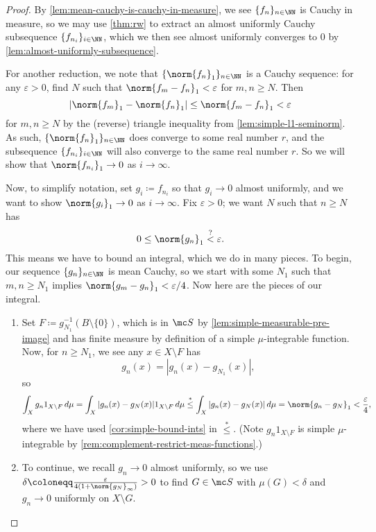 \documentclass[../notes.tex]{subfiles}
\begin{document}
\begin{proof}
	By \autoref{lem:mean-cauchy-is-cauchy-in-measure}, we see $\{f_n\}_{n\in\NN}$ is Cauchy in measure, so we may use \autoref{thm:rw} to extract an almost uniformly Cauchy subsequence $\{f_{n_i}\}_{i\in\NN}$, which we then see almost uniformly converges to $0$ by \autoref{lem:almost-uniformly-subsequence}.
	
	For another reduction, we note that $\{\norm{f_n}_1\}_{n\in\NN}$ is a Cauchy sequence: for any $\varepsilon>0$, find $N$ such that $\norm{f_m-f_n}_1<\varepsilon$ for $m,n\ge N$. Then
	\[|\norm{f_m}_1-\norm{f_n}_1|\le\norm{f_m-f_n}_1<\varepsilon\]
	for $m,n\ge N$ by the (reverse) triangle inequality from \autoref{lem:simple-l1-seminorm}. As such, $\{\norm{f_n}_1\}_{n\in\NN}$ does converge to some real number $r$, and the subsequence $\{f_{n_i}\}_{i\in\NN}$ will also converge to the same real number $r$. So we will show that $\norm{f_{n_i}}_1\to0$ as $i\to\infty$.

	Now, to simplify notation, set $g_i\coloneqq f_{n_i}$ so that $g_i\to0$ almost uniformly, and we want to show $\norm{g_i}_1\to0$ as $i\to\infty$. Fix $\varepsilon>0$; we want $N$ such that $n\ge N$ has
	\[0\le\norm{g_n}_1\stackrel?<\varepsilon.\]
	This means we have to bound an integral, which we do in many pieces. To begin, our sequence $\{g_n\}_{n\in\NN}$ is mean Cauchy, so we start with some $N_1$ such that $m,n\ge N_1$ implies $\norm{g_m-g_n}_1<\varepsilon/4$. Now here are the pieces of our integral.
	\begin{enumerate}
		\item Set $F\coloneqq g_{N_1}^{-1}(B\setminus\{0\})$, which is in $\mc S$ by \autoref{lem:simple-measurable-pre-image} and has finite measure by definition of a simple $\mu$-integrable function.
		Now, for $n\ge N_1$, we see any $x\in X\setminus F$ has
		\[g_n(x)=|g_n(x)-g_{N_1}(x)|,\]
		so
		\[\int_Xg_n1_{X\setminus F}\,d\mu=\int_X|g_n(x)-g_N(x)|1_{X\setminus F}\,d\mu\stackrel*\le\int_X|g_n(x)-g_N(x)|\,d\mu=\norm{g_n-g_N}_1<\frac\varepsilon4,\]
		where we have used \autoref{cor:simple-bound-ints} in $\stackrel*\le$. (Note $g_n1_{X\setminus F}$ is simple $\mu$-integrable by \autoref{rem:complement-restrict-meas-functions}.)

		\item To continue, we recall $g_n\to0$ almost uniformly, so we use $\delta\coloneqq\frac\varepsilon{4(1+\norm{g_N}_\infty)}>0$ to find $G\in\mc S$ with $\mu(G)<\delta$ and $g_n\to0$ uniformly on $X\setminus G$.
	

\end{enumerate}
\end{proof}
\end{document}

